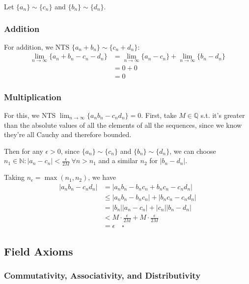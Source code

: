 \documentclass[12pt]{article}
\newcommand{\N}{\mathbb{N}}
\newcommand{\Q}{\mathbb{Q}}
\begin{document}
Let $\{a_n\} \sim \{c_n\}$ and $\{b_n\} \sim \{d_n\}$.

\subsubsection{Addition}

For addition, we NTS $\{a_n + b_n\} \sim \{c_n + d_n\}$:
\begin{align*}
  \lim_{n \to \infty} \{a_n+b_n-c_n-d_n\}
   & = \lim_{n \to \infty} \{a_n-c_n\} + \lim_{n \to \infty} \{b_n-d_n\} \\
   & = 0+0                                                               \\
   & = 0
\end{align*}

\subsubsection{Multiplication}

For this, we NTS $\lim_{n \to \infty} \{a_nb_n-c_nd_n\} = 0$.
First, take $M \in \Q$ s.t. it's greater than the absolute values of all the elements of all the sequences,
since we know they're all Cauchy and therefore bounded.

Then for any $\epsilon > 0$, since $\{a_n\} \sim \{c_n\}$ and $\{b_n\} \sim \{d_n\}$,
we can choose $n_1 \in \N: |a_n-c_n| < \frac{\epsilon}{2M}\ \forall n > n_1$
and a similar $n_2$ for $|b_n-d_n|$.

Taking $n_\epsilon = \max(n_1, n_2)$, we have
\begin{align*}
  |a_nb_n-c_nd_n|
   & = |a_nb_n-b_nc_n+b_nc_n-c_nd_n|                             \\
   & \le |a_nb_n-b_nc_n| + |b_nc_n-c_nd_n|                       \\
   & = |b_n||a_n - c_n| + |c_n||b_n-d_n|                         \\
   & < M \cdot \frac{\epsilon}{2M} + M \cdot \frac{\epsilon}{2M} \\
   & = \epsilon\quad\square
\end{align*}

\subsection{Field Axioms}

\subsubsection{Commutativity, Associativity, and Distributivity}
\end{document}
